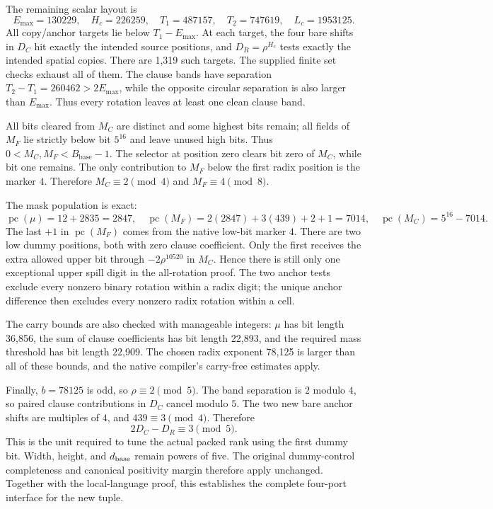 \documentclass[11pt,letterpaper]{article}
\theoremstyle{remark}\newtheorem{remark}[theorem]{Remark}
\newcommand{\pc}{\operatorname{pc}}\newcommand{\PS}{\mathcal P}
\begin{document}
The remaining scalar layout is
\[
 E_{\max}=130229,\quad H_c=226259,\quad
 T_1=487157,\quad T_2=747619,\quad L_c=1953125.
\]
All copy/anchor targets lie below $T_1-E_{\max}$. At each target, the
four bare shifts in $D_C$ hit exactly the intended source positions, and
$D_R=\rho^{H_c}$ tests exactly the intended spatial copies. There are
1,319 such targets. The supplied finite set checks exhaust all of them.
The clause bands have separation $T_2-T_1=260462>2E_{\max}$, while the
opposite circular separation is also larger than $E_{\max}$. Thus every
rotation leaves at least one clean clause band.

All bits cleared from $M_C$ are distinct and some highest bits remain;
all fields of $M_F$ lie strictly below bit $5^{16}$ and leave unused high
bits. Thus $0<M_C,M_F<B_{\mathrm{base}}-1$. The selector at position zero
clears bit zero of $M_C$, while bit one remains. The only contribution to
$M_F$ below the first radix position is the marker $4$. Therefore
$M_C\equiv2\pmod4$ and $M_F\equiv4\pmod8$.

The mask population is exact:
\[
 \pc(\mu)=12+2835=2847,
 \quad\pc(M_F)=2(2847)+3(439)+2+1=7014,
 \quad\pc(M_C)=5^{16}-7014.
\]
The last $+1$ in $\pc(M_F)$ comes from the native low-bit marker $4$.
There are two low dummy positions, both with zero clause coefficient. Only
the first receives the extra allowed upper bit through $-2\rho^{10520}$
in $M_C$. Hence there is still only one exceptional upper spill digit in
the all-rotation proof. The two anchor tests exclude every nonzero binary
rotation within a radix digit; the unique anchor difference then excludes
every nonzero radix rotation within a cell.

The carry bounds are also checked with manageable integers:
$\mu$ has bit length 36,856, the sum of clause coefficients has bit length
22,893, and the required mass threshold has bit length 22,909. The chosen
radix exponent 78,125 is larger than all of these bounds, and the native
compiler's carry-free estimates apply.

Finally, $b=78125$ is odd, so $\rho\equiv2\pmod5$.
The band separation is $2$ modulo $4$, so paired clause contributions in
$D_C$ cancel modulo $5$. The two new bare anchor shifts are multiples of
$4$, and $439\equiv3\pmod4$. Therefore
\[
 2D_C-D_R\equiv3\pmod5.
\]
This is the unit required to tune the actual packed rank using the first
dummy bit. Width, height, and $d_{\rm base}$ remain powers of five.
The original dummy-control completeness and canonical positivity margin
therefore apply unchanged. Together with the local-language proof, this
establishes the complete four-port interface for the new tuple.
\end{document}
